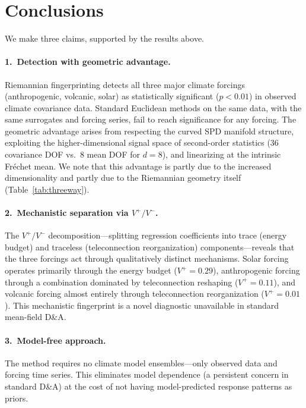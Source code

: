 \documentclass[preprint,12pt]{elsarticle}
\newcommand{\pval}{p}
\begin{document}
\section{Conclusions}\label{sec:conclusions}

We make three claims, supported by the results above.

\paragraph{1.\ Detection with geometric advantage.}
Riemannian fingerprinting detects all three major climate forcings (anthropogenic, volcanic, solar) as statistically significant ($\pval < 0.01$) in observed climate covariance data.
Standard Euclidean methods on the same data, with the same surrogates and forcing series, fail to reach significance for any forcing.
The geometric advantage arises from respecting the curved SPD manifold structure, exploiting the higher-dimensional signal space of second-order statistics (36 covariance DOF vs.\ 8 mean DOF for $d=8$), and linearizing at the intrinsic Fr\'{e}chet mean.
We note that this advantage is partly due to the increased dimensionality and partly due to the Riemannian geometry itself (Table~\ref{tab:threeway}).

\paragraph{2.\ Mechanistic separation via $V^+/V^-$.}
The $V^+/V^-$ decomposition---splitting regression coefficients into trace (energy budget) and traceless (teleconnection reorganization) components---reveals that the three forcings act through qualitatively distinct mechanisms.
Solar forcing operates primarily through the energy budget ($V^+ = 0.29$), anthropogenic forcing through a combination dominated by teleconnection reshaping ($V^+ = 0.11$), and volcanic forcing almost entirely through teleconnection reorganization ($V^+ = 0.01$).
This mechanistic fingerprint is a novel diagnostic unavailable in standard mean-field D\&A.

\paragraph{3.\ Model-free approach.}
The method requires no climate model ensembles---only observed data and forcing time series.
This eliminates model dependence (a persistent concern in standard D\&A) at the cost of not having model-predicted response patterns as priors.
\end{document}
